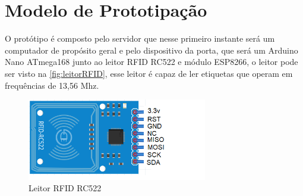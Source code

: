 \section{Modelo de Prototipação}
O protótipo é composto pelo servidor que nesse primeiro instante será um computador de propósito geral e pelo dispositivo da porta, que será um Arduino Nano ATmega168 junto ao leitor RFID RC522 e módulo ESP8266, o leitor pode ser visto na \autoref{fig:leitorRFID}, esse leitor é capaz de ler etiquetas que operam em frequências de 13,56 Mhz.
\begin{figure}[H]
              \caption{\label{fig:leitorRFID}{Leitor RFID RC522}}
              \centering
              \includegraphics[width=0.7\textwidth]{Figuras/rfid_rc522.PNG}
\end{figure}

